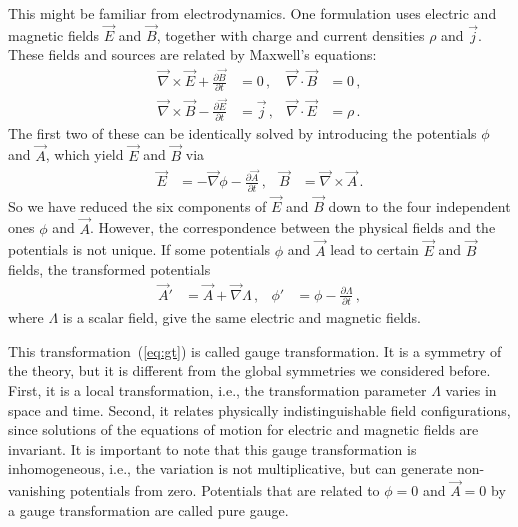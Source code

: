 \documentclass[12pt]{report}
\newcommand{\2}{\ensuremath{\sqrt{2}\,}}
\begin{document}
{      This might be familiar from electrodynamics. One formulation uses electric and magnetic
      fields $\vec{E}$ and $\vec{B}$, together with charge and current densities $\rho$ and
      $\vec{j}$. These fields and sources are related by Maxwell's equations:
      \begin{subequations}
        \begin{align}
          \vec{\nabla} \times \vec{E} + \frac{\partial \vec{B}}{\partial t} &=0 \,, & \vec{\nabla}\cdot
          \vec{B}&=0\,,\\ 
          \vec{\nabla} \times \vec{B} - \frac{\partial \vec{E}}{\partial t} &=\vec{j}\,,
          &\vec{\nabla}\cdot\vec{E} &=\rho\,.
        \end{align}
      \end{subequations}
      The first two of these can be identically solved by introducing the potentials $\phi$
      and $\vec{A}$, which yield $\vec{E}$ and $\vec{B}$ via
      \begin{align}\label{eq:gt}
        \vec{E}&= -\vec{\nabla} \phi -\frac{\partial\vec{A}}{\partial t}\,, & \vec{B}
        &=\vec{\nabla}\times\vec{A}\,.
      \end{align}
      So we have reduced the six components of $\vec{E}$ and $\vec{B}$ down to the four independent
      ones $\phi$ and $\vec{A}$. However, the correspondence between the physical fields and
      the potentials is not unique. If some potentials $\phi$ and $\vec{A}$ lead to
      certain $\vec{E}$ and $\vec{B}$ fields, the transformed potentials
      \begin{align}\label{eq:maxwellgaugetrafo}
        \vec{A}'&= \vec{A} +\vec{\nabla} \Lambda\,, & \phi'& = \phi- \frac{\partial\Lambda}{\partial t}\,,
      \end{align}
      where $\Lambda$ is a scalar field, give the same electric and magnetic fields.
      
      This transformation~(\ref{eq:gt}) is called gauge transformation.
       It is a symmetry of the theory, but it
      is different from the global symmetries we considered before. First, it is a local
      transformation, i.e., the transformation parameter $\Lambda$ varies in space and
      time. Second, it relates physically indistinguishable field configurations, since solutions 
      of the equations of motion for electric and magnetic fields are
      invariant. It is important to note that this gauge transformation is inhomogeneous, i.e.,
      the variation is not multiplicative, but can generate non-vanishing potentials from zero.
      Potentials that are related to $\phi=0$ and $\vec{A}=0$ by a gauge
      transformation are called pure gauge.
      
}
\end{document}
